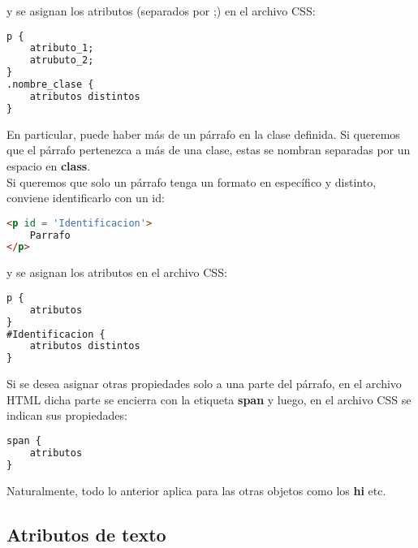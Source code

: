\documentclass[10pt,oneside]{article}
\begin{document}
\begin{multicols}{2}
    y se asignan los atributos (separados por ;) en el archivo CSS:

    \begin{lstlisting}[language=HTML]
p {
    atributo_1;
    atrubuto_2;
}
.nombre_clase {
    atributos distintos
}
    \end{lstlisting}

    En particular, puede haber más de un párrafo en la clase definida. Si queremos que el párrafo pertenezca a más de una clase, estas se nombran separadas por un espacio en \textbf{class}. \\\newline Si queremos que solo un párrafo tenga un formato en específico y distinto, conviene identificarlo con un id:
        
    \begin{lstlisting}[language=HTML]
<p id = 'Identificacion'>
    Parrafo
</p>
    \end{lstlisting}

    y se asignan los atributos en el archivo CSS:

    \begin{lstlisting}[language=HTML]
p {
    atributos
}
#Identificacion {
    atributos distintos
}
    \end{lstlisting}

    Si se desea asignar otras propiedades solo a una parte del párrafo, en el archivo HTML dicha parte se encierra con la etiqueta \textbf{span} y luego, en el archivo CSS se indican sus propiedades:
    
    \begin{lstlisting}[language=HTML]
span {
    atributos
}
    \end{lstlisting}

    Naturalmente, todo lo anterior aplica para las otras objetos como los \textbf{hi} etc.

\subsection{Atributos de texto}


\end{multicols}
\end{document}

